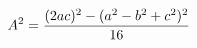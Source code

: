 \documentclass[preview]{standalone}
\begin{document}
\begin{align*}
\special{dvisvgm:raw <g id='unique000'>}A^2 = \frac{(2ac)^2 - (a^2 - b^2 + c^2)^2}{16}\special{dvisvgm:raw </g>}
\end{align*}
\end{document}
